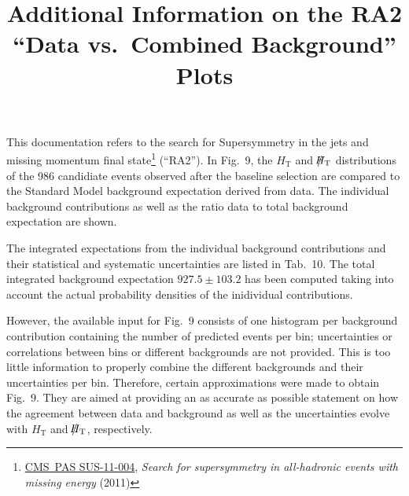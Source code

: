 \documentclass[a4paper]{article}
\title{Additional Information on the RA2 ``Data vs.\ Combined Background'' Plots}
\newcommand{\HT}{\ensuremath{H_{\text{T}}}\xspace}
\newcommand{\MHT}{\ensuremath{\slash\mkern-12mu{H}_{\text{T}}}\xspace}
\begin{document}
\maketitle
\noindent This documentation refers to the search for Supersymmetry in the jets and missing momentum final state\footnote{\href{http://cms.cern.ch/iCMS/analysisadmin/viewanalysis?id=577&field=id&value=577&name=Search\%20for\%20supersymmetry\%20in\%20all-hadronic\%20events\%20with\%20missing\%20energy}{CMS~PAS SUS-11-004}, \textit{Search for supersymmetry in all-hadronic events with missing energy} (2011)} (``RA2'').
In Fig.~9, the \HT and \MHT distributions of the 986 candidiate events observed after the baseline selection are compared to the Standard Model background expectation derived from data.
The individual background contributions as well as the ratio data to total background expectation are shown.

The integrated expectations from the individual background contributions and their statistical and systematic uncertainties are listed in Tab.~10.
The total integrated background expectation \mbox{$927.5\pm103.2$} has been computed taking into account the actual probability densities of the inidividual contributions.

However, the available input for Fig.~9 consists of one histogram per background contribution containing the number of predicted events per bin; uncertainties or correlations between bins or different backgrounds are not provided.
This is too little information to properly combine the different backgrounds and their uncertainties per bin.
Therefore, certain approximations were made to obtain Fig.~9.
They are aimed at providing an as accurate as possible statement on how the agreement between data and background as well as the uncertainties evolve with \HT and \MHT, respectively.
\end{document}
